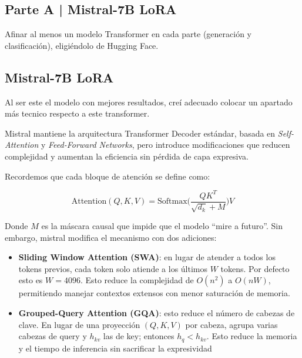 \newpage

\begin{myblock}
\section*{Parte A | Mistral-7B LoRA}

    Afinar al menos un modelo Transformer en cada parte (generación y clasificación), eligiéndolo
    de Hugging Face. 

\end{myblock}



\subsection{Mistral-7B LoRA}

Al ser este el modelo con mejores resultados, creí adecuado colocar un apartado más tecnico respecto
a este transformer. 

Mistral mantiene la arquitectura Transformer Decoder estándar, basada en \textit{Self-Attention}
y \textit{Feed-Forward Networks}, pero introduce modificaciones que reducen complejidad y aumentan
la eficiencia sin pérdida de capa expresiva. 

Recordemos que cada bloque de atención se define como:

\[
    \text{Attention}(Q,K,V) = \text{Softmax} \Big(\frac{QK^T}{\sqrt{d_k}+M}\Big) V
\]

Donde $M$ es la máscara causal que impide que el modelo ``mire a futuro''. Sin embargo, mistral 
modifica el mecanismo con dos adiciones:

\begin{itemize}
    \item \textbf{Sliding Window Attention (SWA)}: en lugar de atender a todos los tokens 
    previos, cada token solo atiende a los últimos $W$ tokens. Por defecto esto es $W = 4096$.
    Esto reduce la complejidad de $O(n^2)$ a $O(nW)$, permitiendo manejar contextos extensos
    con menor saturación de memoria. 
    \item \textbf{Grouped-Query Attention (GQA)}: esto reduce el número de cabezas de clave. En lugar
    de una proyección $(Q,K,V)$ por cabeza, agrupa varias cabezas de query y $h_{kv}$ las de 
    key; entonces $h_q < h_{kv}$. Esto reduce la memoria y el tiempo de inferencia sin sacrificar 
    la expresividad
\end{itemize}

